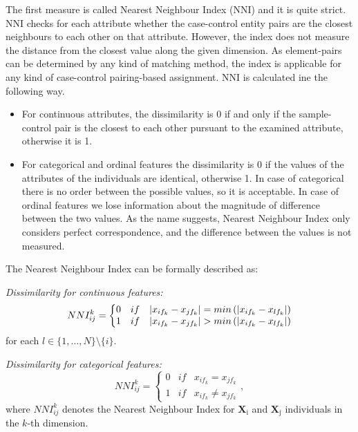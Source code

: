 \noindent The first measure is called Nearest Neighbour Index (NNI) and it is quite strict. NNI checks for each attribute whether the case-control entity pairs are the closest neighbours to each other on that attribute. However, the index does not measure the distance from the closest value along the given dimension. As element-pairs can be determined by any kind of matching method, the index is applicable for any kind of case-control pairing-based assignment. NNI is calculated ine the following way.
\begin{itemize}
	\item For continuous attributes, the dissimilarity is 0 if and only if the sample-control pair is the closest to each other pursuant to the examined attribute, otherwise it is 1.
	\item For categorical and ordinal features the dissimilarity is 0 if the values of the attributes of the individuals are identical, otherwise 1. In case of categorical there is no order between the possible values, so it is acceptable. In case of ordinal features we lose information about the magnitude of difference between the two values. As the name suggests, Nearest Neighbour Index only considers perfect correspondence, and the difference between the values is not measured.
\end{itemize}

\noindent The Nearest Neighbour Index can be formally described as:

\vspace{0.3cm}
\noindent\emph{Dissimilarity for continuous features:}
\begin{equation}
	NNI_{ij}^{k}=\left\{\begin{matrix}
	0 & if &  \lvert x_{if_k}-x_{jf_k}\rvert=min\left(\lvert x_{if_k}-x_{lf_k}\rvert\right) \\
	1 & if &  \lvert x_{if_k}-x_{jf_k}\rvert>min\left(\lvert x_{if_k}-x_{lf_k}\rvert\right)
	\end{matrix}\right.\label{eq:nni_cont}
\end{equation}
for each $l \in \{1, \dots, N\} \setminus \{i\}$.

\vspace{0.3cm}
\noindent\emph{Dissimilarity for categorical features:}
\begin{equation}
	NNI_{ij}^{k}=\left\{\begin{matrix}
	0 & if  & x_{if_k}=x_{jf_k}\\ 
	1 & if  &  x_{if_k}\neq x_{jf_k}
	\end{matrix}\right.\label{eq:ddi_cat},
\end{equation}
where $NNI_{ij}^{k}$ denotes the Nearest Neighbour Index for $\bm{\mathrm{\textbf{X}_i}}$ and $\bm{\mathrm{\textbf{X}_j}}$ individuals in the $k$-th dimension. %

